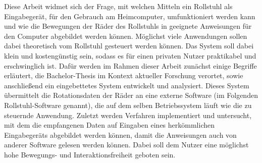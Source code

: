 Diese Arbeit widmet sich der Frage, mit welchen Mitteln ein Rollstuhl als Eingabegerät, für den Gebrauch am Heimcomputer, umfunktioniert werden kann und wie die Bewegungen der Räder des Rollstuhls in geeignete Anweisungen für den Computer abgebildet werden können.
Möglichst viele Anwendungen sollen dabei theoretisch vom Rollstuhl gesteuert werden können.
Das System soll dabei klein und kostengünstig sein, sodass es für einen privaten Nutzer praktikabel und erschwinglich ist.
Dafür werden im Rahmen dieser Arbeit zunächst einige Begriffe erläutert, die Bachelor-Thesis im Kontext aktueller Forschung verortet, sowie anschließend ein eingebettetes System entwickelt und analysiert.
Dieses System übermittelt die Rotationsdaten der Räder an eine externe Software (im Folgenden Rollstuhl-Software genannt), die auf dem selben Betriebssystem läuft wie die zu steuernde Anwendung.
Zuletzt werden Verfahren implementiert und untersucht, mit dem die empfangenen Daten auf Eingaben eines herkömmlichen Eingabegeräts abgebildet werden können, damit die Anweisungen auch von anderer Software gelesen werden können.
Dabei soll dem Nutzer eine möglichst hohe Bewegungs- und Interaktionsfreiheit geboten sein.